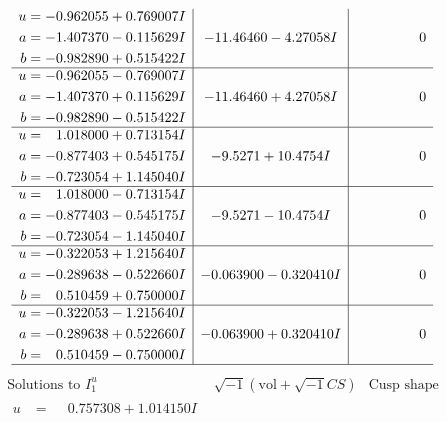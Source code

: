 \documentclass[1p]{elsarticle_modified}
\theoremstyle{definition}
\newcommand{\I}{\sqrt{-1}}
\begin{document}
$$\begin{array}{c|c|c}
\begin{aligned}
u &= -0.962055 + 0.769007 I \\
a &= -1.407370 - 0.115629 I \\
b &= -0.982890 + 0.515422 I\end{aligned}
 & -11.46460 - 4.27058 I & \phantom{-0.000000 } 0 \\ \hline\begin{aligned}
u &= -0.962055 - 0.769007 I \\
a &= -1.407370 + 0.115629 I \\
b &= -0.982890 - 0.515422 I\end{aligned}
 & -11.46460 + 4.27058 I & \phantom{-0.000000 } 0 \\ \hline\begin{aligned}
u &= \phantom{-}1.018000 + 0.713154 I \\
a &= -0.877403 + 0.545175 I \\
b &= -0.723054 + 1.145040 I\end{aligned}
 & -9.5271 + 10.4754 I & \phantom{-0.000000 } 0 \\ \hline\begin{aligned}
u &= \phantom{-}1.018000 - 0.713154 I \\
a &= -0.877403 - 0.545175 I \\
b &= -0.723054 - 1.145040 I\end{aligned}
 & -9.5271 - 10.4754 I & \phantom{-0.000000 } 0 \\ \hline\begin{aligned}
u &= -0.322053 + 1.215640 I \\
a &= -0.289638 - 0.522660 I \\
b &= \phantom{-}0.510459 + 0.750000 I\end{aligned}
 & -0.063900 - 0.320410 I & \phantom{-0.000000 } 0 \\ \hline\begin{aligned}
u &= -0.322053 - 1.215640 I \\
a &= -0.289638 + 0.522660 I \\
b &= \phantom{-}0.510459 - 0.750000 I\end{aligned}
 & -0.063900 + 0.320410 I & \phantom{-0.000000 } 0\\
 \hline 
 \end{array}$$\newpage$$\begin{array}{c|c|c}  
\text{Solutions to }I^u_{1}& \I (\text{vol} + \sqrt{-1}CS) & \text{Cusp shape}\\
 \hline 
\begin{aligned}
u &= \phantom{-}0.757308 + 1.014150 I \\

\end{aligned}
\end{array}$$
\end{document}
